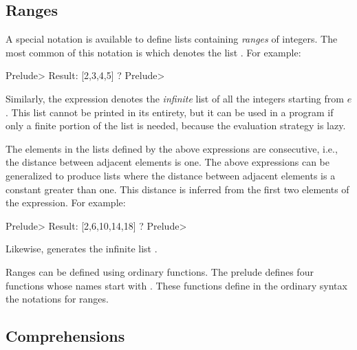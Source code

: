 \subsection{Ranges}
\label{list-ranges}

A special notation is available to define lists containing
\emph{ranges} of integers.
The most common of this notation is \ccode{[$e_1$\,..\,$e_2$]}
which denotes the list \ccode{[$e_1,e_1+1,e_1+2,\cdots,e_2$]}.
For example:
%
\begin{prog}
Prelude> \userinput{[2\,..\,5]}
Result: [2,3,4,5] ? 
Prelude> 
\end{prog}
%
Similarly, the expression \ccode{[$e$\,..]}
denotes the \emph{infinite}
list of all the integers starting from $e$.
This list cannot be printed in its entirety,
but it can be used in a program
if only a finite portion of the list is needed,
because the evaluation strategy is lazy.

The elements in the lists defined by the above expressions
are consecutive, i.e., the distance between adjacent elements is one.
The above expressions can be generalized to produce lists
where the distance between adjacent elements is a constant greater than one.
This distance is inferred from the first two elements of the expression.
For example:
%
\begin{prog}
Prelude> \userinput{[2,\,6\,..\,20]}
Result: [2,6,10,14,18] ? 
Prelude> 
\end{prog}
%
Likewise, \ccode{[2,\,6\,..]}
generates the infinite list \ccode{[2,6,10,14,$\ldots$]}.

Ranges can be defined using ordinary functions.
The prelude defines four functions whose names start with
.  These functions define in the ordinary
syntax the notations for ranges.

\subsection{Comprehensions}
\label{list-comprehensions}

